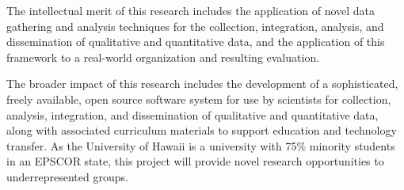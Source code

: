 \documentclass[11pt]{article}
\begin{document}
The intellectual merit of this research includes the application of novel
data gathering and analysis techniques for the collection, integration,
analysis, and dissemination of qualitative and quantitative data, and the
application of this framework to a real-world organization and resulting
evaluation.

The broader impact of this research includes the development of a
sophisticated, freely available, open source software system for use by
scientists for collection, analysis, integration, and dissemination of
qualitative and quantitative data, along with associated curriculum
materials to support education and technology transfer.  As the University
of Hawaii is a university with 75\% minority students in an EPSCOR state,
this project will provide novel research opportunities to underrepresented
groups.
\end{document}
